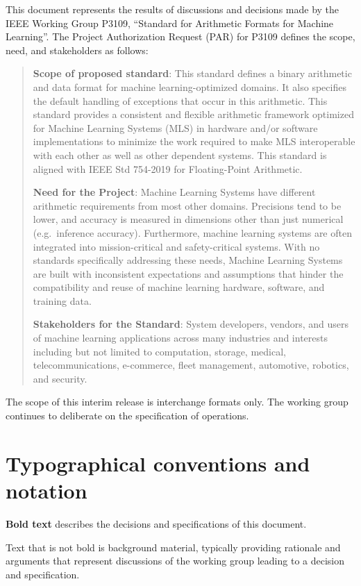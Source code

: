 \documentclass{article}
\begin{document}
This document represents the results of discussions and decisions made by the IEEE Working Group P3109, ``Standard for Arithmetic Formats for Machine Learning''.
The Project Authorization Request (PAR) for P3109 defines the scope, need, and stakeholders as follows:
\begin{quote}
{\bf Scope of proposed standard}: 
This standard defines a binary arithmetic and data format for machine learning-optimized domains.
It also specifies the default handling of exceptions that occur in this arithmetic.
This standard provides a consistent and flexible arithmetic framework optimized for Machine Learning Systems (MLS) in hardware and/or software implementations to minimize the work required to make MLS interoperable with each other as well as other dependent systems.
This standard is aligned with IEEE Std 754-2019 for Floating-Point Arithmetic.

{\bf Need for the Project}:
Machine Learning Systems have different arithmetic requirements from most other domains. Precisions tend to be lower, and accuracy is measured in dimensions other than just numerical (e.g.\ inference accuracy).
Furthermore, machine learning systems are often integrated into mission-critical and safety-critical systems.
With no standards specifically addressing these needs, Machine Learning Systems are built with inconsistent expectations and assumptions that hinder the compatibility and reuse of machine learning hardware, software, and training data.

{\bf Stakeholders for the Standard}:
System developers, vendors, and users of machine learning applications across many industries and interests including but not limited to computation, storage, medical, telecommunications, e-commerce, fleet management, automotive, robotics, and security.
\end{quote}
The scope of this interim release is interchange formats only.  The working group continues to deliberate on the specification of operations.

\section{Typographical conventions and notation}

\newcommand{\spec}[1]{{\bf #1}}
\spec{Bold text} describes the decisions and specifications of this document.

Text that is not bold is background material, typically providing rationale and arguments that represent discussions of the working group leading to a decision and specification.
\end{document}
